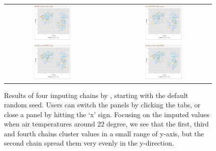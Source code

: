 \documentclass[article]{jss}
\begin{document}
\begin{center}
\begin{figure}[h]
\begin{centering}
\begin{tabular}{cccc}
\includegraphics[width=0.4\textwidth]{graph/fig10-1-chain} &  &  & \includegraphics[width=0.4\textwidth]{graph/fig10-2-chain}\tabularnewline
\includegraphics[width=0.4\textwidth]{graph/fig10-3-chain} &  &  & \includegraphics[width=0.4\textwidth]{graph/fig10-4-chain}\tabularnewline
\end{tabular}
\par\end{centering}
\caption{Results of four imputing chains by , starting with the default random seed. Users can switch the panels by clicking the tabs, or close a panel by hitting the `x' sign. Focusing on the imputed values when air temperatures around 22 degree, we see that the first, third and fourth chains cluster values in a small range of y-axis, but the second chain spread them very evenly in the y-direction.}
\label{fig:chaintabs}
\end{figure}
\par\end{center}
\end{document}
